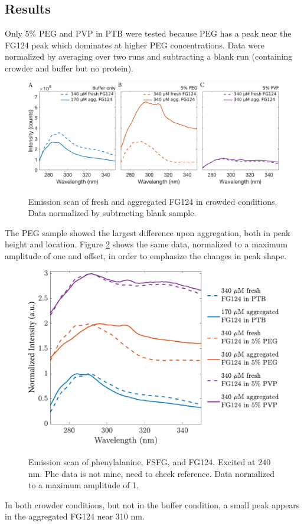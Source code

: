 \subsection{Results}
Only 5\% PEG and PVP in PTB were tested because PEG has a peak near the FG124 peak which dominates at higher PEG concentrations.  Data were normalized by averaging over two runs and subtracting a blank run (containing crowder and buffer but no protein).
\begin{figure}
\caption{Emission scan of fresh and aggregated FG124 in crowded conditions.  Data normalized by subtracting blank sample.}
\centering
\includegraphics[width=1.1\textwidth]{figs/ch05/FG124-fresh-vs-agg}
\label{fig:FG124-fresh-vs-agg}
\end{figure}
The PEG sample showed the largest difference upon aggregation, both in peak height and location.  Figure \ref{fig:stacked-FG124-fluorimetry} shows the same data, normalized to a maximum amplitude of one and offset, in order to emphasize the changes in peak shape.
\begin{figure}
\caption{Emission scan of phenylalanine, FSFG, and FG124. Excited at 240 nm.  Phe data is not mine, need to check reference. Data normalized to a maximum amplitude of 1.}
\centering
\includegraphics[width=\textwidth]{figs/ch05/stacked-FG124-fluorimetry}
\label{fig:stacked-FG124-fluorimetry}
\end{figure}
In both crowder conditions, but not in the buffer condition, a small peak appears in the aggregated FG124 near 310 nm.

